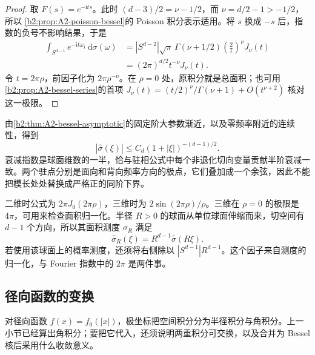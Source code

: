 \begin{proof}
取 \(F(s)=e^{-\mathrm i ts}\)。此时
\((d-3)/2=\nu-1/2\)，而 \(\nu=d/2-1>-1/2\)，所以
\cref{b2:prop:A2-poisson-bessel}的 Poisson 积分表示适用。将 \(s\) 换成 \(-s\) 后，指数的负号不影响结果，于是
\[
\begin{aligned}
 \int_{S^{d-1}}e^{-\mathrm i t\omega_1}\,\mathrm d\sigma(\omega)
 &=|S^{d-2}|\sqrt\pi\,\Gamma(\nu+1/2)
       \left(\frac2t\right)^\nu J_\nu(t)\\
 &=(2\pi)^{d/2}t^{-\nu}J_\nu(t).
\end{aligned}
\]
令 \(t=2\pi\rho\)，前因子化为 \(2\pi\rho^{-\nu}\)。在 \(\rho=0\) 处，原积分就是总面积；也可用
\cref{b2:prop:A2-bessel-series}的首项
\(J_\nu(t)=(t/2)^\nu/\Gamma(\nu+1)+O(t^{\nu+2})\)
核对这一极限。
\end{proof}

由\cref{b2:thm:A2-bessel-asymptotic}的固定阶大参数渐近，以及零频率附近的连续性，得到
\[
 |\widehat\sigma(\xi)|
 \le C_d(1+|\xi|)^{-(d-1)/2}.
\]
衰减指数是球面维数的一半，恰与驻相公式中每个非退化切向变量贡献半阶衰减一致。两个驻点分别是面向和背向频率方向的极点，它们叠加成一个余弦，因此不能把模长处处替换成严格正的同阶下界。

\ProseParagraphBreak

二维时公式为 \(2\pi J_0(2\pi\rho)\)，三维时为
\(2\sin(2\pi\rho)/\rho\)。三维在 \(\rho=0\) 的极限是 \(4\pi\)，可用来检查面积归一化。半径 \(R>0\) 的球面从单位球面伸缩而来，切空间有 \(d-1\) 个方向，所以其面积测度 \(\sigma_R\) 满足
\[
 \widehat\sigma_R(\xi)=R^{d-1}\widehat\sigma(R\xi).
\]
若使用该球面上的概率测度，还须将右侧除以
\(|S^{d-1}|R^{d-1}\)。这个因子来自测度的归一化，与 Fourier 指数中的 \(2\pi\) 是两件事。

\subsection{径向函数的变换}
\label{b2:subsec:A20202}

对径向函数 \(f(x)=f_0(|x|)\)，极坐标把空间积分分为半径积分与角积分。上一小节已经算出角积分；要把它代入，还须说明两重积分可交换，以及合并为 Bessel 核后采用什么收敛意义。

